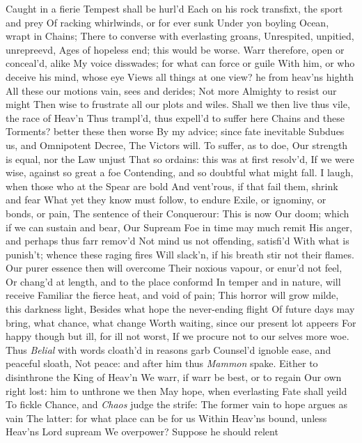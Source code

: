 \documentclass[11pt]{book}
\newcounter {first}
\newcounter {last}
\begin{document}
Caught in a fierie Tempest shall be hurl'd 
Each on his rock transfixt, the sport and prey 
Of racking whirlwinds, or for ever sunk 
Under yon boyling Ocean, wrapt in Chains; 
There to converse with everlasting groans, 
Unrespited, unpitied, unrepreevd, 
Ages of hopeless end; this would be worse. 
Warr therefore, open or conceal'd, alike 
My voice disswades; for what can force or guile 
With him, or who deceive his mind, whose eye 
Views all things at one view? he from heav'ns highth 
All these our motions vain, sees and derides; 
Not more Almighty to resist our might 
Then wise to frustrate all our plots and wiles. 
Shall we then live thus vile, the race of Heav'n 
Thus trampl'd, thus expell'd to suffer here 
Chains and these Torments? better these then worse 
By my advice; since fate inevitable 
Subdues us, and Omnipotent Decree, 
The Victors will.  To suffer, as to doe, 
Our strength is equal, nor the Law unjust 
That so ordains: this was at first resolv'd, 
If we were wise, against so great a foe 
Contending, and so doubtful what might fall. 
I laugh, when those who at the Spear are bold 
And vent'rous, if that fail them, shrink and fear 
What yet they know must follow, to endure 
Exile, or ignominy, or bonds, or pain, 
The sentence of their Conquerour: This is now 
Our doom; which if we can sustain and bear, 
Our Supream Foe in time may much remit 
His anger, and perhaps thus farr remov'd 
Not mind us not offending, satisfi'd 
With what is punish't; whence these raging fires 
Will slack'n, if his breath stir not their flames. 
Our purer essence then will overcome 
Their noxious vapour, or enur'd not feel, 
Or chang'd at length, and to the place conformd 
In temper and in nature, will receive 
Familiar the fierce heat, and void of pain; 
This horror will grow milde, this darkness light, 
Besides what hope the never-ending flight 
Of future days may bring, what chance, what change 
Worth waiting, since our present lot appeers 
For happy though but ill, for ill not worst, 
If we procure not to our selves more woe. 
\quad Thus \textit{Belial} with words cloath'd in reasons garb 
Counsel'd ignoble ease, and peaceful sloath, 
Not peace: and after him thus \textit{Mammon} spake. 
\quad Either to disinthrone the King of Heav'n 
We warr, if warr be best, or to regain 
Our own right lost: him to unthrone we then 
May hope, when everlasting Fate shall yeild 
To fickle Chance, and \textit{Chaos} judge the strife: 
The former vain to hope argues as vain 
The latter: for what place can be for us 
Within Heav'ns bound, unless Heav'ns Lord supream 
We overpower?  Suppose he should relent 
\end{document}
